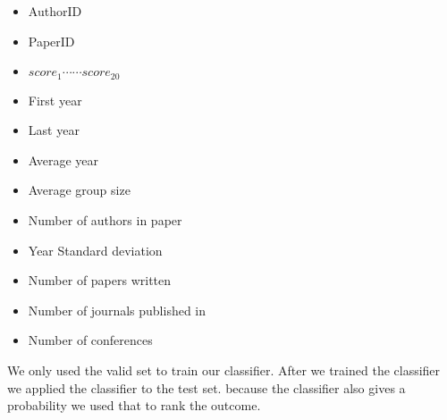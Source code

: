 \begin{itemize}
\item [] AuthorID 
\item [] PaperID 
\item [] $score_1 \cdots \cdots score_{20}$ 
\item [] First year 
\item [] Last year 
\item [] Average year 
\item [] Average group size
\item [] Number of authors in paper
\item [] Year Standard deviation 
\item [] Number of papers written
\item [] Number of journals published in 
\item [] Number of conferences
\end{itemize}

We only used the valid set to train our classifier. After we trained the classifier we applied the classifier to the test set. because the classifier also gives a probability we used that to rank the outcome.




